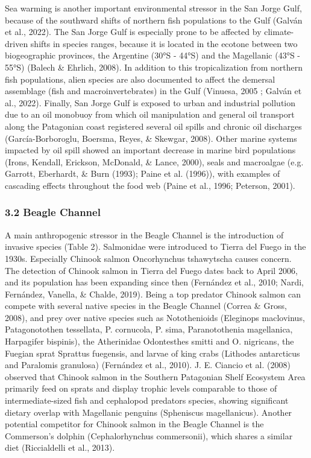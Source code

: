 \documentclass[
]{article}
\begin{document}
Sea warming is another important environmental stressor in the San Jorge
Gulf, because of the southward shifts of northern fish populations to
the Gulf (Galván et al., 2022). The San Jorge Gulf is especially prone
to be affected by climate-driven shifts in species ranges, because it is
located in the ecotone between two biogeographic provinces, the
Argentine (30°S - 44°S) and the Magellanic (43°S - 55°S) (Balech \&
Ehrlich, 2008). In addition to this tropicalization from northern fish
populations, alien species are also documented to affect the demersal
assemblage (fish and macroinvertebrates) in the Gulf (Vinuesa, 2005 ;
Galván et al., 2022). Finally, San Jorge Gulf is exposed to urban and
industrial pollution due to an oil monobuoy from which oil manipulation
and general oil transport along the Patagonian coast registered several
oil spills and chronic oil discharges (García-Borboroglu, Boersma,
Reyes, \& Skewgar, 2008). Other marine systems impacted by oil spill
showed an important decrease in marine bird populations (Irons, Kendall,
Erickson, McDonald, \& Lance, 2000), seals and macroalgae (e.g. Garrott,
Eberhardt, \& Burn (1993); Paine et al. (1996)), with examples of
cascading effects throughout the food web (Paine et al., 1996; Peterson,
2001).

\hypertarget{beagle-channel}{%
\subsubsection{3.2 Beagle Channel}\label{beagle-channel}}

A main anthropogenic stressor in the Beagle Channel is the introduction
of invasive species (Table 2). Salmonidae were introduced to Tierra del
Fuego in the 1930s. Especially Chinook salmon Oncorhynchus tshawytscha
causes concern. The detection of Chinook salmon in Tierra del Fuego
dates back to April 2006, and its population has been expanding since
then (Fernández et al., 2010; Nardi, Fernández, Vanella, \& Chalde,
2019). Being a top predator Chinook salmon can compete with several
native species in the Beagle Channel (Correa \& Gross, 2008), and prey
over native species such as Notothenioids (Eleginops maclovinus,
Patagonotothen tessellata, P. cornucola, P. sima, Paranotothenia
magellanica, Harpagifer bispinis), the Atherinidae Odontesthes smitti
and O. nigricans, the Fuegian sprat Sprattus fuegensis, and larvae of
king crabs (Lithodes antarcticus and Paralomis granulosa) (Fernández et
al., 2010). J. E. Ciancio et al. (2008) observed that Chinook salmon in
the Southern Patagonian Shelf Ecosystem Area primarily feed on sprats
and display trophic levels comparable to those of intermediate-sized
fish and cephalopod predators species, showing significant dietary
overlap with Magellanic penguins (Spheniscus magellanicus). Another
potential competitor for Chinook salmon in the Beagle Channel is the
Commerson's dolphin (Cephalorhynchus commersonii), which shares a
similar diet (Riccialdelli et al., 2013).
\end{document}
